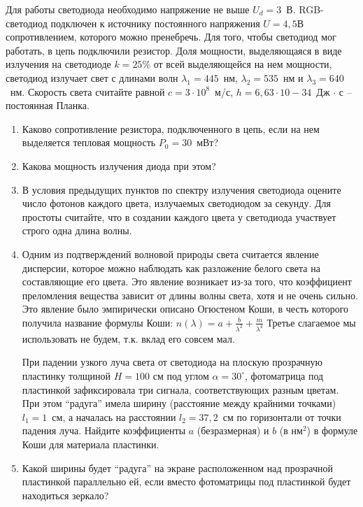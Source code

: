 
Для работы светодиода необходимо напряжение не выше $U_d = 3$~В. RGB-светодиод подключен к источнику постоянного 
напряжения $U = 4,5$В сопротивлением, которого можно пренебречь. Для того, чтобы светодиод мог работать, в цепь 
подключили резистор. Доля мощности, выделяющаяся в виде излучения на светодиоде $k = 25\%$ от всей выделяющейся на нем мощности, светодиод излучает 
свет с длинами волн $\lambda_1=445$~нм, $\lambda_2=535$~нм и $\lambda_3=640$~нм. Скорость света считайте равной 
$c=3 \cdot 10^8$~м/с, $h = 6,63 \cdot 10-{34}$~Дж $\cdot$ с – постоянная Планка.

\begin{enumerate}
    \item Каково сопротивление резистора, подключенного в цепь, если на нем выделяется тепловая мощность $P_0 = 30$~мВт?
    \item Какова мощность излучения диода при этом?
    \item В условия предыдущих пунктов по спектру излучения светодиода оцените число фотонов каждого цвета, излучаемых светодиодом за секунду. Для простоты считайте, что в создании каждого цвета у светодиода участвует строго одна длина волны.
    \item Одним из подтверждений волновой природы света считается явление дисперсии, которое можно наблюдать 
    как разложение белого света на составляющие его цвета. Это явление возникает из-за того, что коэффициент 
    преломления вещества зависит от длины волны света, хотя и не очень сильно. Это явление было эмпирически 
    описано Огюстеном Коши, в честь которого получила название формулы Коши: $n(\lambda)=a+\frac{b}{\lambda^2} + \frac{m}{\lambda^4}$  
    Третье слагаемое мы использовать не будем, т.к. вклад его совсем мал.
    
    При падении узкого луча света от светодиода на плоскую прозрачную пластинку толщиной $H = 100$ см под углом 
    $\alpha = 30^{\circ}$, фотоматрица под пластинкой зафиксировала три сигнала, соответствующих разным цветам. 
    При этом “радуга” имела ширину (расстояние между крайними точками) $l_1 = 1$~см, а началась на расстоянии 
    $l_2 = 37,2$~см по горизонтали от точки падения луча. Найдите коэффициенты $a$ (безразмерная) и $b$ (в нм$^2$) в 
    формуле Коши для материала пластинки.
    \item Какой ширины будет “радуга” на экране расположенном над прозрачной пластинкой параллельно ей, если вместо фотоматрицы под пластинкой будет находиться зеркало?
\end{enumerate}